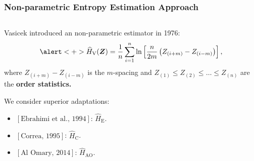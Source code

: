 \documentclass[aspectratio=1610,10pt]{beamer}
\begin{document}
\begin{frame} \frametitle{\large{Non-parametric Entropy Estimation Approach}}

 \justifying
\begin{columns}[T,onlytextwidth]
    \begin{column}{.45\textwidth}
			\begin{block}{}\justifying

Vasicek introduced an  non-parametric estimator in 1976: \begin{equation*}
\label{E:Vas}
    \alert<+>{\widehat{H}_{\text{V}}(\bm{Z})=\frac{1}{n}\sum_{i=1}^{n}\ln\left[\frac{n}{2m}\left(Z_{(i+m)}-Z_{(i-m)}\right)\right],}
    \end{equation*} where
\(Z_{(i+m)}-Z_{(i-m)}\) is the \(m\)-spacing and
\(Z_{(1)}\leq Z_{(2)}\leq\ldots\leq Z_{(n)}\) are the \textbf{order statistics.}

\pause

We consider superior adaptations:
\begin{itemize}
\item $\left[\text{Ebrahimi et al., 1994}\right]$: \(\widehat{H}_{\mathrm{E}}\).
\item  $\left[\text{Correa, 1995}\right]$: \(\widehat{H}_{\text{C}}\).
\item  $\left[\text{Al Omary, 2014}\right]$: \(\widehat{H}_{\mathrm{AO}}\).
\end{itemize}
		\end{block}
    \end{column}
		

\end{columns}
\end{frame}
\end{document}
